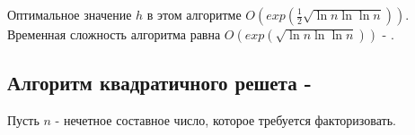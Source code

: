   Оптимальное значение $h$ в этом алгоритме $O(exp(\frac{1}{2}\sqrt{\ln{n}\ln{\ln{n}}}))$. Временная сложность 
  алгоритма равна $O(exp(\sqrt{\ln{n}\ln{\ln{n}}}))$ - \cite[Глава 4, страницы 115-142]{ish11}.

  \subsection{Алгоритм квадратичного решета - \cite[Глава 6.4, страница 220-225]{mah06}}
  Пусть {$n$} - нечетное составное число, которое требуется факторизовать.

